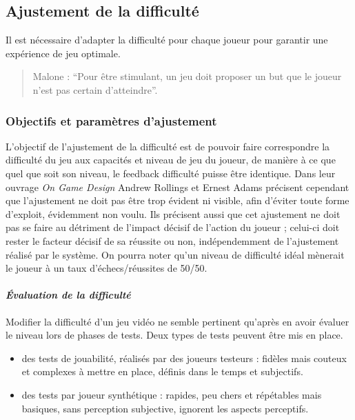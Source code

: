 	\subsection{Ajustement de la difficulté}
Il est nécessaire d'adapter la difficulté pour chaque joueur pour garantir une expérience de jeu optimale.			
\begin{quote}Malone : “Pour être stimulant, un jeu doit proposer un but que le joueur n’est pas certain d’atteindre”.
\end{quote}

	\subsubsection{Objectifs et paramètres d'ajustement}
L’objectif de l’ajustement de la difficulté est de pouvoir faire correspondre la difficulté du jeu aux capacités et niveau de jeu du joueur, de manière à ce que quel que soit son niveau, le feedback difficulté puisse être identique. Dans leur ouvrage \emph{On Game Design} \cite{Andr03} Andrew Rollings et Ernest Adams précisent cependant que l’ajustement ne doit pas être trop évident ni visible, afin d’éviter toute forme d’exploit, évidemment non voulu. Ils précisent aussi que cet ajustement ne doit pas se faire au détriment de l’impact décisif de l’action du joueur ; celui-ci doit rester le facteur décisif de sa réussite ou non, indépendemment de l’ajustement réalisé par le système. On pourra noter qu’un niveau de difficulté idéal mènerait le joueur à un taux d’échecs/réussites de 50/50.

		\paragraph{\emph{Évaluation de la difficulté}\\ \quad}
Modifier la difficulté d'un jeu vidéo ne semble pertinent qu'après en avoir évaluer le niveau lors de phases de tests. Deux types de tests peuvent être mis en place. 
\begin{itemize}
	\item des tests de jouabilité, réalisés par des joueurs testeurs : fidèles mais couteux et complexes à mettre en place, définis dans le temps et subjectifs.
	\item des tests par joueur synthétique : rapides, peu chers et répétables mais basiques, sans perception subjective, ignorent les aspects perceptifs.
\end {itemize}

